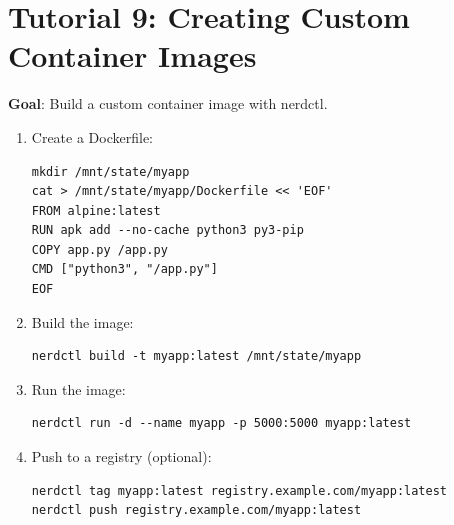 \section{Tutorial 9: Creating Custom Container Images}

\textbf{Goal}: Build a custom container image with nerdctl.

\begin{enumerate}[nosep]
  \item Create a Dockerfile:
\begin{lstlisting}
mkdir /mnt/state/myapp
cat > /mnt/state/myapp/Dockerfile << 'EOF'
FROM alpine:latest
RUN apk add --no-cache python3 py3-pip
COPY app.py /app.py
CMD ["python3", "/app.py"]
EOF
\end{lstlisting}
  \item Build the image:
\begin{lstlisting}
nerdctl build -t myapp:latest /mnt/state/myapp
\end{lstlisting}
  \item Run the image:
\begin{lstlisting}
nerdctl run -d --name myapp -p 5000:5000 myapp:latest
\end{lstlisting}
  \item Push to a registry (optional):
\begin{lstlisting}
nerdctl tag myapp:latest registry.example.com/myapp:latest
nerdctl push registry.example.com/myapp:latest
\end{lstlisting}
\end{enumerate}
